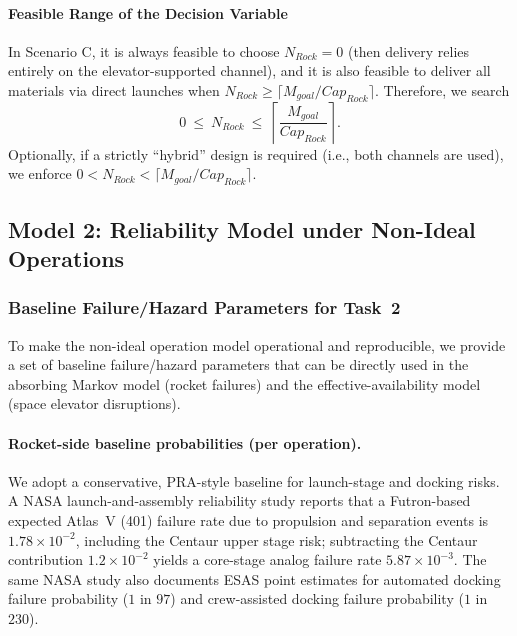 ﻿\documentclass{mcmthesis}
\begin{document}
\paragraph{Feasible Range of the Decision Variable}
\label{sec:scenarioC_feasible}

In Scenario C, it is always feasible to choose $N_{Rock}=0$ (then delivery relies entirely
on the elevator-supported channel), and it is also feasible to deliver all materials via
direct launches when $N_{Rock}\ge \lceil M_{goal}/Cap_{Rock}\rceil$. Therefore, we search
\begin{equation}
0\ \le\ N_{Rock}\ \le\ \left\lceil\frac{M_{goal}}{Cap_{Rock}}\right\rceil.
\label{eq:N_range_C}
\end{equation}
Optionally, if a strictly ``hybrid'' design is required (i.e., both channels are used), we
enforce $0 < N_{Rock} < \lceil M_{goal}/Cap_{Rock}\rceil$.


\subsection{Model 2: Reliability Model under Non-Ideal Operations}
\label{sec:model2}

\subsubsection{Baseline Failure/Hazard Parameters for Task~2}
\label{sec:model2_baseline_params}

To make the non-ideal operation model operational and reproducible, we provide a
set of baseline failure/hazard parameters that can be directly used in the absorbing
Markov model (rocket failures) and the effective-availability model (space elevator disruptions).

\paragraph{Rocket-side baseline probabilities (per operation).}
We adopt a conservative, PRA-style baseline for launch-stage and docking risks.
A NASA launch-and-assembly reliability study reports that a Futron-based expected
Atlas~V (401) failure rate due to propulsion and separation events is $1.78\times 10^{-2}$,
including the Centaur upper stage risk; subtracting the Centaur contribution
$1.2\times 10^{-2}$ yields a core-stage analog failure rate $5.87\times 10^{-3}$.
The same NASA study also documents ESAS point estimates for automated docking
failure probability ($1$ in $97$) and crew-assisted docking failure probability ($1$ in $230$).
\cite{nasa_launch_assembly_reliability_2013}
\end{document}
